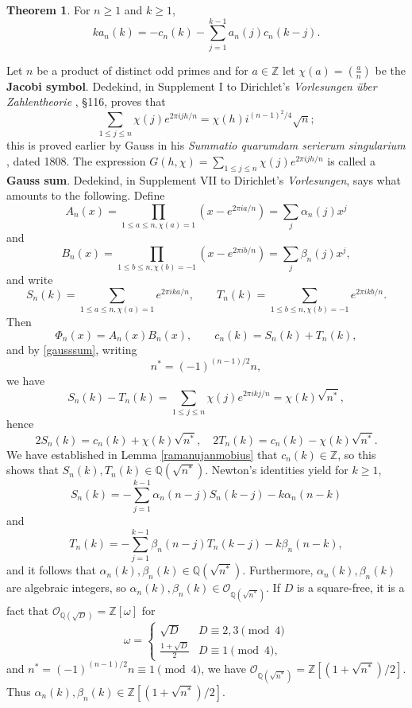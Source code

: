 \documentclass{article}
\theoremstyle{definition}
\newtheorem{theorem}{Theorem}
\theoremstyle{definition}
\begin{document}
\begin{theorem}
For $n \geq 1$ and $k \geq 1$,
\[
ka_n(k) = -c_n(k) - \sum_{j=1}^{k-1} a_n(j) c_n(k-j).
\]
\end{theorem}





Let $n$ be a product of distinct odd primes and for $a \in \mathbb{Z}$ let $\chi(a) = \left( \frac{a}{n}\right)$ be the \textbf{Jacobi symbol}. 
Dedekind, in Supplement I to Dirichlet's {\em Vorlesungen \"uber Zahlentheorie}  \cite[pp.~208--210]{dirichlet}, \S 116, proves that
\begin{equation}
\sum_{1 \leq j \leq n} \chi(j) e^{2\pi ij h/n} = \chi(h) i^{(n-1)^2/4} \sqrt{n};
\label{gausssum}
\end{equation}
this is proved earlier by 
Gauss in his {\em Summatio quarumdam serierum singularium} \cite[pp.~9--45]{gaussII}, dated 1808.
The expression $G(h,\chi)=\sum_{1 \leq j \leq n} \chi(j) e^{2\pi ij h/n}$ is called a \textbf{Gauss sum}.
Dedekind, in Supplement VII to Dirichlet's {\em Vorlesungen}, says what amounts to
the following.
Define
\[
A_n(x) = \prod_{1 \leq a \leq n, \chi(a)=1} (x-e^{2\pi ia/n}) = \sum_j \alpha_n(j) x^j
\] 
and
\[
B_n(x) = \prod_{1 \leq b \leq n, \chi(b)=-1} (x-e^{2\pi ib/n}) = \sum_j \beta_n(j) x^j,
\]
and write
\[
S_n(k) =  \sum_{1 \leq a \leq n, \chi(a)=1} e^{2\pi ik a/n},
\qquad T_n(k) = \sum_{1 \leq b \leq n, \chi(b)=-1} e^{2\pi ik b/n}.
\]
Then
\[
\Phi_n(x) = A_n(x) B_n(x),\qquad c_n(k) = S_n(k) + T_n(k),
\]
and by \eqref{gausssum}, writing
\[
n^*=(-1)^{(n-1)/2} n,
\]
we have
\[
S_n(k) - T_n(k) =\sum_{1 \leq j \leq n} \chi(j) e^{2\pi ik j/n} = \chi(k)  \sqrt{n^*},
\]
hence
\[
2S_n(k) = c_n(k) +  \chi(k)   \sqrt{n^*},
\quad
2T_n(k) = c_n(k) -  \chi(k)  \sqrt{n^*}.
\]
We have  established in Lemma \ref{ramanujanmobius} that $c_n(k) \in \mathbb{Z}$, so this shows that
$S_n(k), T_n(k) \in \mathbb{Q}(\sqrt{n^*})$.
Newton's identities yield for $k \geq 1$,
\[
S_n(k) = -\sum_{j=1}^{k-1}  \alpha_n(n-j) S_n(k-j) - k\alpha_n(n-k)
\]
and
\[
T_n(k) = -\sum_{j=1}^{k-1}  \beta_n(n-j) T_n(k-j) - k\beta_n(n-k),
\]
and it follows that $\alpha_n(k),\beta_n(k) \in \mathbb{Q}( \sqrt{n^*})$.
Furthermore, $\alpha_n(k),\beta_n(k)$ are algebraic integers, so
$\alpha_n(k),\beta_n(k) \in \mathcal{O}_{\mathbb{Q}(\sqrt{n^*})}$. 
If $D$ is a square-free, it is a fact \cite[p.~698, \S 15.3]{dummit} that 
$\mathcal{O}_{\mathbb{Q}(\sqrt{D})} = \mathbb{Z}[\omega]$ for 
\[
\omega = \begin{cases}
\sqrt{D}&D \equiv 2,3 \pmod{4}\\
\frac{1+\sqrt{D}}{2}&D \equiv 1 \pmod{4},
\end{cases}
\]
and $n^*=(-1)^{(n-1)/2} n \equiv 1 \pmod{4}$, we have
$\mathcal{O}_{\mathbb{Q}(\sqrt{n^*})} = \mathbb{Z}[(1+\sqrt{n^*})/2]$. Thus
$\alpha_n(k),\beta_n(k) \in  \mathbb{Z}[(1+\sqrt{n^*})/2]$. 
\end{document}
